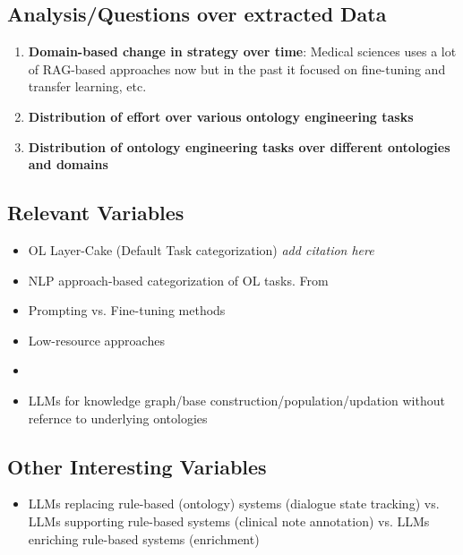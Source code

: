 \documentclass[a4paper,colorinlistoftodos]{article}
\begin{document}
\subsection{Analysis/Questions over extracted Data}
\label{subsec:analysis-over-data}
\begin{enumerate}
  \item \textbf{Domain-based change in strategy over time}: Medical sciences
    uses a lot of RAG-based approaches now but in the past it focused on
    fine-tuning and transfer learning, etc.
  \item \textbf{Distribution of effort over various ontology engineering
      tasks}
  \item \textbf{Distribution of ontology engineering tasks over different
      ontologies and domains}
\end{enumerate}
  
  

\subsection{Relevant Variables}
\label{subsec:relevant-variables}

\begin{itemize}
\item OL Layer-Cake (Default Task categorization) \textit{add citation here}
\item NLP approach-based categorization of OL tasks.
  From \cite{du2024ShortReviewOntology}
\item Prompting vs. Fine-tuning methods
\item Low-resource approaches
\item 
\item LLMs for knowledge graph/base construction/population/updation without
  refernce to underlying ontologies
\end{itemize}

\subsection{Other Interesting Variables}
\label{subsec:other-variables}

\begin{itemize}
  \item LLMs replacing rule-based (ontology) systems (dialogue state tracking)
    vs. LLMs supporting rule-based systems (clinical note annotation) vs. LLMs
    enriching rule-based systems (enrichment)
  \end{itemize}





\end{document}
